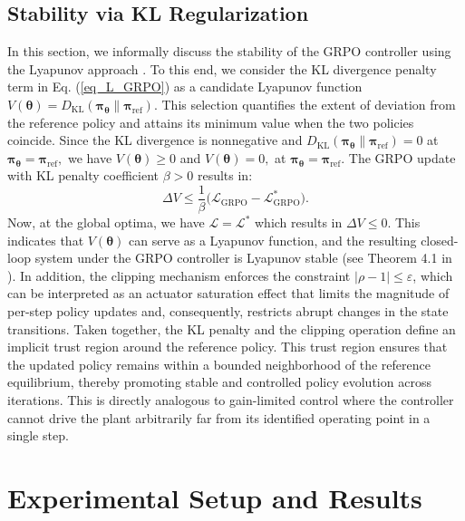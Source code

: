 \documentclass[letterpaper, 10 pt, conference]{ieeeconf}
\begin{document}
\subsection{Stability via KL Regularization}

In this section, we informally discuss the stability of the GRPO controller using the Lyapunov approach \cite{Lyapunov1892,Khalil2002,Michel2015}. To this end, we consider the KL divergence penalty term in Eq. (\ref{eq_L_GRPO}) as a candidate Lyapunov function $V(\bm{\theta}) = D_{\mathrm{KL}}(\bm{\pi}_{\bm{\theta}} \| \bm{\pi}_{\mathrm{ref}})$.  This selection quantifies the extent of deviation from the reference policy and attains its minimum value when the two policies coincide. Since the KL divergence is nonnegative and $D_{\mathrm{KL}}(\bm{\pi}_{\bm{\theta}}\| \bm{\pi}_{\mathrm{ref}})=0$ at $\bm{\pi}_{\bm{\theta}}=\bm{\pi}_{\mathrm{ref}},$ we have $V(\bm{\theta}) \geq 0$ and $V(\bm{\theta})=0,$ at $\bm{\pi}_{\bm{\theta}}=\bm{\pi}_{\mathrm{ref}}.$ 
The GRPO update with KL penalty coefficient $\beta > 0$ results in:
\begin{equation}
    \Delta V \le \frac{1}{\beta}\bigl(\mathcal{L}_{\mathrm{GRPO}} - \mathcal{L}_{\mathrm{GRPO}}^*\bigr).
\end{equation}
Now, at the global optima, we have $\mathcal{L}=\mathcal{L}^{*}$ which results in $\Delta V \leq 0.$ This indicates that $V(\bm{\theta})$ can serve as a Lyapunov function, and the resulting closed-loop system under the GRPO controller is Lyapunov stable (see Theorem 4.1 in \cite{Khalil2002}). 
In addition, the clipping mechanism enforces the constraint $|\rho - 1| \le \varepsilon$, which can be interpreted as an actuator saturation effect that limits the magnitude of per-step policy updates and, consequently, restricts abrupt changes in the state transitions. Taken together, the KL penalty and the clipping operation define an implicit trust region around the reference policy. This trust region ensures that the updated policy remains within a bounded neighborhood of the reference equilibrium, thereby promoting stable and controlled policy evolution across iterations. This is directly analogous to gain-limited control where the controller cannot drive the plant arbitrarily far from its identified operating point in a single step. 

\section{Experimental Setup and Results}
\end{document}

